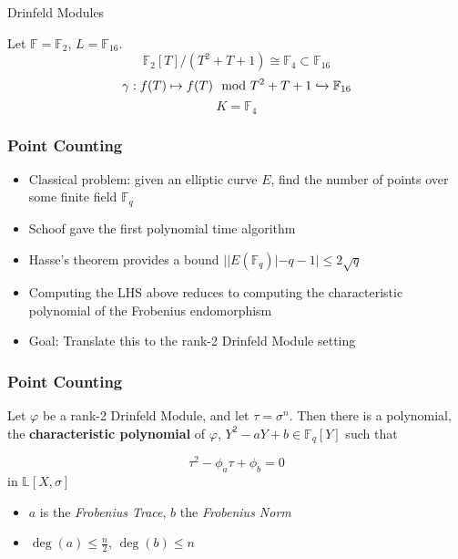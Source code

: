 \documentclass{beamer}
\newcommand{\f}{\mathbb{F}}
\begin{document}
 \begin{frame}{Drinfeld Modules}
   \begin{example}
   Let $\f = \f_2$, $L = \mathbb{F}_{16}$.
   \[ \f_2[T]/(T^2 + T + 1) \cong \f_4 \subset \f_{16}\]
   \[ \gamma : f(T) \mapsto f(T) \mod T^2 + T + 1 \xhookrightarrow{} \f_{16} \]
   \[K = \f_4\]
   \end{example}

\end{frame}






\begin{frame}
\frametitle{Point Counting}

\begin{itemize}
\item Classical problem: given an elliptic curve $E$, find the number of points over some finite field $\mathbb{F}_q$ 
\item Schoof gave the first polynomial time algorithm
\item Hasse's theorem provides a bound $ | |E(\mathbb{F}_q)| - q - 1  | \leq 2 \sqrt{q} $

\item Computing the LHS above reduces to computing the characteristic polynomial of the Frobenius endomorphism

\item Goal: Translate this to the rank-2 Drinfeld Module setting
\end{itemize}

\end{frame}









\begin{frame}
\frametitle{Point Counting}

\begin{theorem}[Gekeler, 1991]
Let $\varphi$ be a rank-2 Drinfeld Module, and let $\tau = \sigma^n$. Then there is a polynomial, the \textbf{characteristic polynomial} of $\varphi$,  $Y^2 - aY +b \in \mathbb{F}_q[Y]$ such that

\[\tau^2 -\phi_a\tau + \phi_b = 0\]
in $\mathbb{L}[X,\sigma]$
\end{theorem}

\begin{itemize}
    \item $a$ is the \textit{Frobenius Trace}, $b$ the \textit{Frobenius Norm}
    \item $\deg(a) \leq \frac{n}{2}$, $\deg(b) \leq n$
\end{itemize}

\end{frame}
\end{document}
